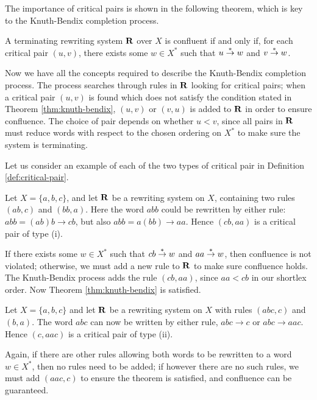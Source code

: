 The importance of critical pairs is shown in the following theorem, which is key
to the Knuth-Bendix completion process.

\begin{theorem}
  \label{thm:knuth-bendix}
  A terminating rewriting system $\mathbf{R}$ over $X$ is confluent if and only if,
  for each critical pair $(u, v)$, there exists some $w \in X^*$ such that
  $u \stackrel{*}{\to} w$ and $v \stackrel{*}{\to} w$.
\end{theorem}

Now we have all the concepts required to describe the Knuth-Bendix completion
process.  The process searches through rules in $\mathbf{R}$ looking for critical
pairs; when a critical pair $(u, v)$ is found which does not satisfy the
condition stated in Theorem \ref{thm:knuth-bendix}, $(u, v)$ or $(v, u)$ is
added to $\mathbf{R}$ in order to ensure confluence.  The choice of pair depends on
whether $u < v$, since all pairs in $\mathbf{R}$ must reduce words with respect to the
chosen ordering on $X^*$ to make sure the system is terminating.

Let us consider an example of each of the two types of critical pair in
Definition \ref{def:critical-pair}.

\begin{example}
  Let $X=\{a,b,c\}$, and let $\mathbf{R}$ be a rewriting system on $X$, containing
  two rules $(ab, c)$ and $(bb, a)$.  Here the word $abb$ could be
  rewritten by either rule: $abb = (ab)b \to cb$, but also
  $abb = a(bb) \to aa$.  Hence $(cb, aa)$ is a critical pair of type (i).

  If there exists some $w \in X^*$ such that $cb \stackrel{*}{\to} w$ and $aa \stackrel{*}{\to} w$,
  then confluence is not violated; otherwise, we must add a new rule to $\mathbf{R}$
  to make sure confluence holds.  The Knuth-Bendix process adds the rule
  $(cb, aa)$, since $aa < cb$ in our shortlex order.  Now Theorem
  \ref{thm:knuth-bendix} is satisfied.
\end{example}

\begin{example}
  Let $X=\{a,b,c\}$ and let $\mathbf{R}$ be a rewriting system on $X$ with rules
  $(abc, c)$ and $(b, a)$.  The word $abc$ can now be written by either rule,
  $abc \to c$ or $abc \to aac$.  Hence $(c, aac)$ is a critical pair of type
  (ii).

  Again, if there are other rules allowing both words to be rewritten to a word
  $w \in X^*$, then no rules need to be added; if however there are no such
  rules, we must add $(aac, c)$ to ensure the theorem is satisfied, and
  confluence can be guaranteed.
\end{example}

